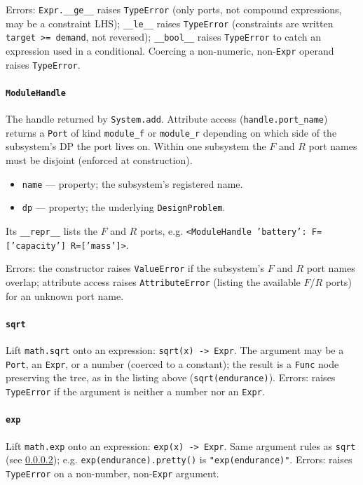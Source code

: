 \documentclass[11pt,a4paper]{article}
\begin{document}
Errors: \texttt{Expr.\_\_ge\_\_} raises \texttt{TypeError} (only ports, not
compound expressions, may be a constraint LHS); \texttt{\_\_le\_\_} raises
\texttt{TypeError} (constraints are written \texttt{target >= demand}, not
reversed); \texttt{\_\_bool\_\_} raises \texttt{TypeError} to catch an
expression used in a conditional. Coercing a non-numeric, non-\texttt{Expr}
operand raises \texttt{TypeError}.

\paragraph{\texttt{ModuleHandle}}\label{ref:sugar:modulehandle}
The handle returned by \texttt{System.add}. Attribute access
(\texttt{handle.port\_name}) returns a \texttt{Port} of kind
\texttt{module\_f} or \texttt{module\_r} depending on which side of the
subsystem's DP the port lives on. Within one subsystem the $F$ and $R$
port names must be disjoint (enforced at construction).

\begin{itemize}[nosep]
  \item \texttt{name} --- property; the subsystem's registered name.
  \item \texttt{dp} --- property; the underlying \texttt{DesignProblem}.
\end{itemize}

Its \texttt{\_\_repr\_\_} lists the $F$ and $R$ ports, e.g.
\texttt{<ModuleHandle 'battery': F=['capacity'] R=['mass']>}.

Errors: the constructor raises \texttt{ValueError} if the subsystem's $F$
and $R$ port names overlap; attribute access raises \texttt{AttributeError}
(listing the available $F$/$R$ ports) for an unknown port name.

\paragraph{\texttt{sqrt}}\label{ref:sugar:sqrt}
Lift \texttt{math.sqrt} onto an expression: \texttt{sqrt(x) -> Expr}. The
argument may be a \texttt{Port}, an \texttt{Expr}, or a number (coerced to
a constant); the result is a \texttt{Func} node preserving the tree, as in
the listing above (\texttt{sqrt(endurance)}). Errors: raises
\texttt{TypeError} if the argument is neither a number nor an \texttt{Expr}.

\paragraph{\texttt{exp}}\label{ref:sugar:exp}
Lift \texttt{math.exp} onto an expression: \texttt{exp(x) -> Expr}. Same
argument rules as \texttt{sqrt} (see \ref{ref:sugar:sqrt}); e.g.
\texttt{exp(endurance).pretty()} is \texttt{"exp(endurance)"}. Errors:
raises \texttt{TypeError} on a non-number, non-\texttt{Expr} argument.
\end{document}
